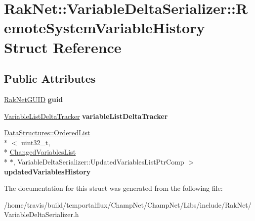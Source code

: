 \hypertarget{struct_rak_net_1_1_variable_delta_serializer_1_1_remote_system_variable_history}{\section{Rak\-Net\-:\-:Variable\-Delta\-Serializer\-:\-:Remote\-System\-Variable\-History Struct Reference}
\label{struct_rak_net_1_1_variable_delta_serializer_1_1_remote_system_variable_history}
}
\subsection*{Public Attributes}
\begin{DoxyCompactItemize}
\item 
\hypertarget{struct_rak_net_1_1_variable_delta_serializer_1_1_remote_system_variable_history_a724ccad4fdfa5754037ded52f5b5ae8a}{\hyperlink{struct_rak_net_1_1_rak_net_g_u_i_d}{Rak\-Net\-G\-U\-I\-D} {\bfseries guid}}\label{struct_rak_net_1_1_variable_delta_serializer_1_1_remote_system_variable_history_a724ccad4fdfa5754037ded52f5b5ae8a}

\item 
\hypertarget{struct_rak_net_1_1_variable_delta_serializer_1_1_remote_system_variable_history_a4ad19181755fdf786984a5839431345c}{\hyperlink{class_rak_net_1_1_variable_list_delta_tracker}{Variable\-List\-Delta\-Tracker} {\bfseries variable\-List\-Delta\-Tracker}}\label{struct_rak_net_1_1_variable_delta_serializer_1_1_remote_system_variable_history_a4ad19181755fdf786984a5839431345c}

\item 
\hypertarget{struct_rak_net_1_1_variable_delta_serializer_1_1_remote_system_variable_history_a21aebf67edce20ed09727be828079ec3}{\hyperlink{class_data_structures_1_1_ordered_list}{Data\-Structures\-::\-Ordered\-List}\\*
$<$ uint32\-\_\-t, \\*
\hyperlink{struct_rak_net_1_1_variable_delta_serializer_1_1_changed_variables_list}{Changed\-Variables\-List} \\*
$\ast$, Variable\-Delta\-Serializer\-::\-Updated\-Variables\-List\-Ptr\-Comp $>$ {\bfseries updated\-Variables\-History}}\label{struct_rak_net_1_1_variable_delta_serializer_1_1_remote_system_variable_history_a21aebf67edce20ed09727be828079ec3}

\end{DoxyCompactItemize}


The documentation for this struct was generated from the following file\-:\begin{DoxyCompactItemize}
\item 
/home/travis/build/temportalflux/\-Champ\-Net/\-Champ\-Net/\-Libs/include/\-Rak\-Net/Variable\-Delta\-Serializer.\-h\end{DoxyCompactItemize}
